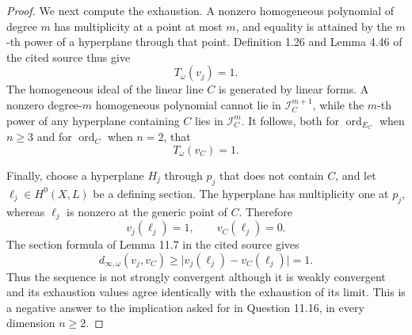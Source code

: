 \begin{proof}
We next compute the exhaustion.  A nonzero homogeneous polynomial of degree
\(m\) has multiplicity at a point at most \(m\), and equality is attained by
the \(m\)-th power of a hyperplane through that point.  Definition 1.26 and
Lemma 4.46 of the cited source thus give
\[
                              T_\omega(v_j)=1.
\tag{4}\label{eq:p11pn-T-point}
\]
The homogeneous ideal of the linear line \(C\) is generated by linear
forms.  A nonzero degree-\(m\) homogeneous polynomial cannot lie in
\(\mathcal I_C^{m+1}\), while the \(m\)-th power of any hyperplane
containing \(C\) lies in \(\mathcal I_C^m\).  It follows, both for
\(\operatorname{ord}_{E_C}\) when \(n\geq3\) and for
\(\operatorname{ord}_C\) when \(n=2\), that
\[
                              T_\omega(v_C)=1.
\tag{5}\label{eq:p11pn-T-center}
\]

Finally, choose a hyperplane \(H_j\) through \(p_j\) that does not contain
\(C\), and let \(\ell_j\in H^0(X,L)\) be a defining section.  The hyperplane
has multiplicity one at \(p_j\), whereas \(\ell_j\) is nonzero at the
generic point of \(C\).  Therefore
\[
                          v_j(\ell_j)=1,
                          \qquad v_C(\ell_j)=0.
\tag{6}\label{eq:p11pn-moving-hyperplane}
\]
The section formula of Lemma 11.7 in the cited source gives
\[
 d_{\infty,\omega}(v_j,v_C)
 \geq \lvert v_j(\ell_j)-v_C(\ell_j)\rvert=1.
\tag{7}\label{eq:p11pn-strong-gap}
\]
Thus the sequence is not strongly convergent although it is weakly
convergent and its exhaustion values agree identically with the exhaustion
of its limit.  This is a negative answer to the implication asked for in
Question 11.16, in every dimension \(n\geq2\).
\end{proof}
